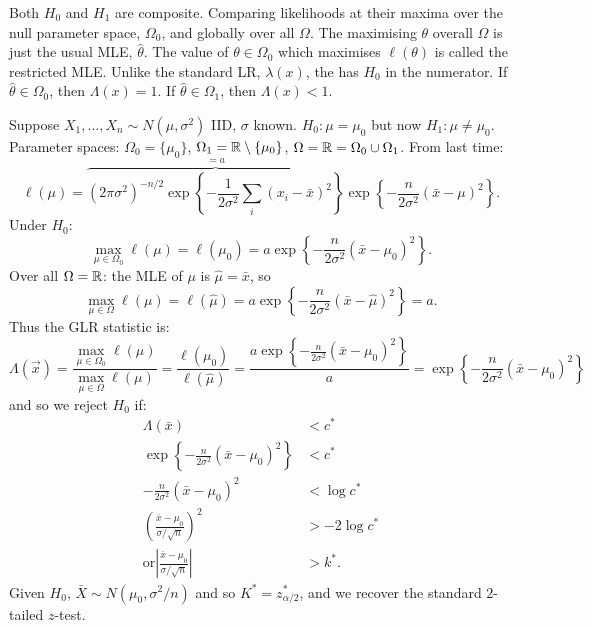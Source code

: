 \documentclass[10pt, a4paper]{article}
\begin{document}
Both $H_0$ and $H_1$ are composite.
Comparing likelihoods at their maxima over the null parameter space,
$\Omega_0$,
and globally over all $\Omega$.
The maximising $\theta$ overall $\Omega$ is just the usual MLE,
$\hat{\theta}$.
The value of $\theta \in \Omega_0$ which maximises $\ell(\theta)$ is called the restricted MLE.
Unlike the standard LR,
$\lambda(x)$,
the has $H_0$ in the numerator.
If $\hat{\theta} \in \Omega_0$,
then $\Lambda(x) = 1$.
If $\hat{\theta} \in \Omega_1$,
then $\Lambda(x) < 1$.

\begin{example}
    Suppose $X_1, \dotsc, X_n \sim N(\mu, \sigma ^ 2)$ IID,
    $\sigma$ known.
    $H_0 : \mu = \mu_0$ but now $H_1 : \mu \neq \mu_0$.
    Parameter spaces:
    $\Omega_0 = \{\mu_0\}$,
    $\Omega_1 = \mathbb{R} \setminus \{\mu_0\}$,
    $\Omega = \mathbb{R} = \Omega_0 \cup \Omega_1$.
    From last time:
    \[
    \ell(\mu) = \overbrace{(2\pi\sigma ^ 2) ^ {-n / 2}\exp\left\{-\frac{1}{2\sigma ^ 2}\sum_{i}(x_i - \bar{x}) ^ 2\right\}}^{= a}\exp\left\{-\frac{n}{2\sigma ^ 2}(\bar{x} - \mu) ^ 2\right\}.
    \]
    Under $H_0$:
    \[
    \max_{\mu \in \Omega_0}\ell(\mu) = \ell(\mu_0) = a\exp\left\{-\frac{n}{2\sigma ^ 2}(\bar{x} - \mu_0) ^ 2\right\}.
    \]
    Over all $\Omega = \mathbb{R}$:
    the MLE of $\mu$ is $\hat{\mu} = \bar{x}$,
    so
    \[
    \max_{\mu \in \Omega}\ell(\mu) = \ell(\hat{\mu}) = a\exp\left\{-\frac{n}{2\sigma ^ 2}(\bar{x} - \hat{\mu}) ^ 2\right\} = a.
    \]
    Thus the GLR statistic is:
    \[
    \Lambda(\vec{x}) = \frac{\max_{\mu \in \Omega_0}\ell(\mu)}{\max_{\mu \in \Omega}\ell(\mu)} = \frac{\ell(\mu_0)}{\ell(\hat{\mu})} = \frac{a\exp\left\{-\frac{n}{2\sigma ^ 2}(\bar{x} - \mu_0) ^ 2\right\}}{a} = \exp\left\{-\frac{n}{2\sigma ^ 2}(\bar{x} - \mu_0) ^ 2\right\}
    \]
    and so we reject $H_0$ if:
    \begin{align*}
        \Lambda(\bar{x}) &< c ^ {*} \\
        \exp\left\{-\frac{n}{2\sigma ^ 2}(\bar{x} - \mu_0) ^ 2\right\} &< c ^ {*} \\
        -\frac{n}{2\sigma ^ 2}(\bar{x} - \mu_0) ^ 2 &< \log{c ^ {*}} \\
        \left(\frac{\bar{x} - \mu_0}{\sigma / \sqrt{n}}\right) ^ 2 &> -2\log{c ^ {*}} \\
        \text{or} \left|\frac{\bar{x} - \mu_0}{\sigma / \sqrt{n}}\right| &> k ^ {*}.
    \end{align*}
    Given $H_0$,
    $\bar{X} \sim N(\mu_0, \sigma ^ 2 / n)$ and so $K ^ {*} = z_{\alpha / 2}^{*}$,
    and we recover the standard $2$-tailed $z$-test.
\end{example}
\end{document}

